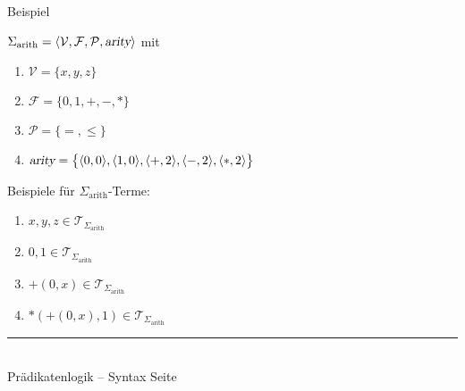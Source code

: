 \documentclass{slides}
\newcommand{\myrule}{\rule{20cm}{1mm}\\ }
\def\pair(#1,#2){\langle #1, #2 \rangle}
\newcounter{mypage}
\begin{document}

\begin{slide}{}
\normalsize
\begin{center}
Beispiel
\end{center}
\vspace{0.5cm}

\footnotesize
$\Sigma_\mathrm{arith} = \langle \mathcal{V}, \mathcal{F}, \mathcal{P},\textsl{arity}\rangle$ \quad mit
\begin{enumerate}
\item $\mathcal{V} = \{ x, y, z \}$
\item $\mathcal{F} = \{ 0, 1, \mathtt{+}, \mathtt{-}, \mathtt{*} \}$
\item $\mathcal{P} = \{\mathtt{=}, \leq\}$ 
\item $\textsl{arity} = \bigl\{ \pair(0,0), \pair(1,0), \pair(\mathtt{+},2),\pair(\mathtt{-},2), \pair(\mathtt{*},2) \bigr\}$
\end{enumerate}

Beispiele f\"{u}r  $\Sigma_{\mathrm{arith}}$-Terme:
\begin{enumerate}
\item $x, y, z \in \mathcal{T}_{\Sigma_{\mathrm{arith}}}$
\item $0, 1 \in \mathcal{T}_{\Sigma_{\mathrm{arith}}}$
\item $\mathtt{+}(0,x) \in \mathcal{T}_{\Sigma_{\mathrm{arith}}}$
\item $\mathtt{*}(\mathtt{+}(0,x),1) \in \mathcal{T}_{\Sigma_{\mathrm{arith}}}$
\end{enumerate}

\vspace*{\fill}
\tiny \addtocounter{mypage}{1}
\myrule
Pr\"{a}dikatenlogik -- Syntax  \hspace*{\fill} Seite 
\end{slide}


\end{document}
